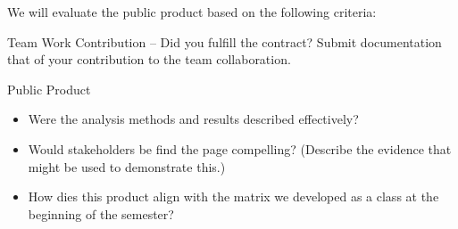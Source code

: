 \documentclass{article}\usepackage[]{graphicx}\usepackage[]{color}
\newenvironment{itemize*}%
  {\begin{itemize}%
    \setlength{\itemsep}{0pt}%
    \setlength{\parskip}{0pt}}%
  {\end{itemize}}
\begin{document}
We will evaluate the public product based on the following criteria:

\begin{itemize*}
  \item Team Work Contribution -- Did you fulfill the contract? Submit documentation that of your contribution to the team collaboration.
  \item Public Product
    \begin{itemize}
      \item Were the analysis methods and results described effectively?
      \item Would stakeholders be find the page compelling? (Describe the evidence that might be used to demonstrate this.)
      \item How dies this product align with the matrix we developed as a class at the beginning of the semester?
    \end{itemize}
\end{itemize*}
\end{document}
